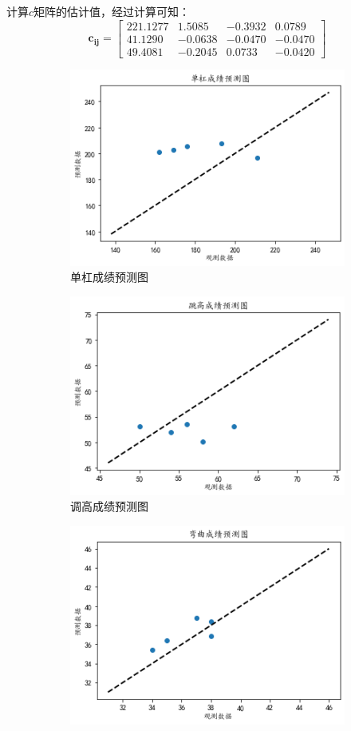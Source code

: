 \documentclass[a4paper,12pt]{article}
\begin{document}
计算$c$矩阵的估计值，经过计算可知：
$$
\boldsymbol{c_{ij}}=\left[\begin{array}{cccc}
	221.1277&1.5085 &-0.3932  &0.0789 \\
	41.1290 & -0.0638 & -0.0470 & -0.0470 \\
	49.4081& -0.2045 & 0.0733 & -0.0420
\end{array}\right]
$$
\begin{figure}[!h]
	\centering
	\begin{subfigure}{0.48\textwidth}
		\centering   
		\includegraphics[scale=0.5]{pic/1.png}
		\caption{单杠成绩预测图}
		\label{fig:sub1}
	\end{subfigure}   %
	\begin{subfigure}{0.48\textwidth}
		\centering   
		\includegraphics[scale=0.5]{pic/output_10_0.png}
		\caption{调高成绩预测图}
		\label{fig:sub2}
	\end{subfigure}
	\begin{subfigure}{0.48\textwidth}
		\centering   
		\includegraphics[scale=0.5]{pic/output_10_3.png}

\end{subfigure}
\end{figure}
\end{document}
